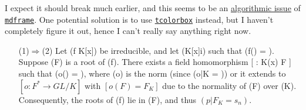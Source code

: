I expect it should break much earlier, and this seems to be an \href{https://github.com/marcodaniel/mdframed/issues/9}{algorithmic issue} of \href{https://ctan.org/pkg/mdframed?lang=en}{\texttt{mdframe}}. One potential solution is to use \href{https://ctan.org/pkg/tcolorbox?lang=en}{\texttt{tcolorbox}} instead, but I haven't completely figure it out, hence I can't really say anything right now.

\begin{itemize}
	\item[(1)$\Rightarrow$(2)] Let (f \in K[x]) be irreducible, and let (\mu \in K[x]i) such that (f(\mu) = \mu). Suppose (\alpha \in F) is a root of (f). There exists a field homomorphism [ \sigma: K(x) \to F ] such that (o(\alpha) = \beta), where (o) is the norm (since (o|K = )) or it extends to $[ o: F^* \to G{L/K} ]$ with $[ o(F) = F_K ]$ due to the normality of (F) over (K). Consequently, the roots of (f) lie in (F), and thus $(p|{F_K} = s_n)$.
\end{itemize}